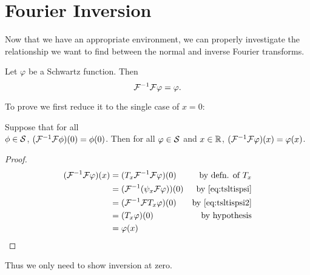     \section{Fourier Inversion}
      Now that we have an appropriate environment, we can properly investigate the relationship we want to find between the normal and inverse Fourier transforms.
      \begin{thm}
        \label{thm:fourinv}
        Let $\varphi$ be a Schwartz function.
        Then \[\F^{-1}\F \varphi = \varphi\text{.}\]
      \end{thm}
      To prove  we first reduce it to the single case of $x=0$:
      \begin{claim}
        Suppose that for all\\$\phi\in\S$, $(\F^{-1}\F\phi)(0) = \phi(0)$.
        Then for all $\varphi\in\S$ and $x\in\R$, $(\F^{-1}\F\varphi)(x)=\varphi(x)$.
        \begin{proof}
          \begin{align*}
            (\F^{-1}\F\varphi)(x) &= (T_x\F^{-1}\F\varphi)(0) &\text{by defn. of $T_x$}\\
            &= (\F^{-1}(\psi_x\F\varphi))(0) &\text{by \eqref{eq:tsltispsi}}\\
            &= (\F^{-1}\F T_x\varphi)(0)  &\text{by \eqref{eq:tsltispsi2}}\\
            &= (T_x\varphi)(0) &\text{by hypothesis}\\
            &= \varphi(x)
          \end{align*}
        \end{proof}
      \end{claim}
      Thus we only need to show inversion at zero.

